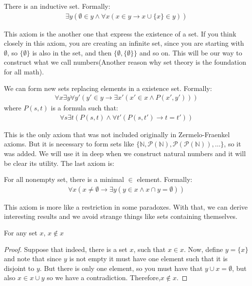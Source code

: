 \documentclass{tufte-handout}
\begin{document}
\begin{axiom}
	There is an inductive set. Formally:
	\begin{align*}
		\exists y(\emptyset \in y \wedge \forall x(x \in y \rightarrow x \cup \{x\} \in y))
	\end{align*}
\end{axiom}

This axiom is the another one that express the existence of a set. If you think closely in this axiom, you are creating an infinite set, since you are starting with $\emptyset$, so $\{\emptyset\}$ is also in the set, and then $\{\emptyset, \{\emptyset\}\}$ and so on. This will be our way to construct what we call numbers(Another reason why set theory is the foundation for all math).

\begin{axiom}
	We can form new sets replacing elements in a existence set. Formally:
	\begin{align*}
		\forall x \exists y \forall y'(y' \in y \rightarrow \exists x'(x' \in x \wedge P(x', y')))
	\end{align*}
	where $P(s, t)$ is a formula such that:
	\begin{align*}
		\forall s \exists t(P(s, t) \wedge \forall t'(P(s, t') \rightarrow t = t'))
	\end{align*}
\end{axiom}

This is the only axiom that was not included originally in Zermelo-Fraenkel axioms. But it is necessary to form sets like $\{\mathbb{N}, \mathcal{P}(\mathbb{N}), \mathcal{P}(\mathcal{P}(\mathbb{N})), \dots\}$, so it was added. We will use it in deep when we construct natural numbers and it will be clear its utility. The last axiom is:
\begin{axiom}
	For all nonempty set, there is a minimal $\in$ element. Formally:
	\begin{align*}
		\forall x(x \neq \emptyset \rightarrow \exists y(y \in x \wedge x \cap y = \emptyset))
	\end{align*}
\end{axiom}

This axiom is more like a restriction in some paradoxes. With that, we can derive interesting results and we avoid strange things like sets containing themselves.
\begin{theorem}
	For any set $x$, $x \not \in x$
\end{theorem}
\begin{proof}
	Suppose that indeed, there is a set $x$, such that $x \in x$. Now, define $y = \{x\}$ and note that since $y$ is not empty it must have one element such that it is disjoint to $y$. But there is only one element, so you must have that $y \cup x = \emptyset$, but also $x \in x \cup y$ so we have a contradiction. Therefore,$x \not \in x$. 
\end{proof}
\end{document}
